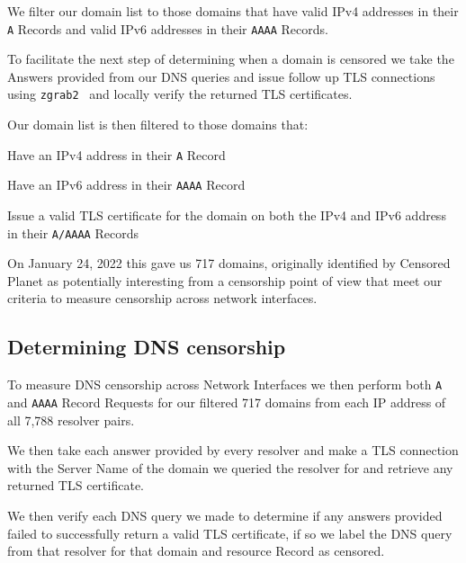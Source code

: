 We filter our domain list to those domains that have valid IPv4 addresses in
their \texttt{A} Records and valid IPv6 addresses in their \texttt{AAAA}
Records.

To facilitate the next step of determining when a domain is censored we take the
Answers provided from our DNS queries and issue follow up TLS connections using
\texttt{zgrab2}~\cite{Durumeric13zmap} and locally verify the returned TLS
certificates.

Our domain list is then filtered to those domains that:
\begin{packed_enumerate}
    \item Have an IPv4 address in their \texttt{A} Record
    \item Have an IPv6 address in their \texttt{AAAA} Record
    \item Issue a valid TLS certificate for the domain on both the IPv4 and IPv6
    address in their \texttt{A/AAAA} Records
\end{packed_enumerate}

On January 24, 2022 this gave us 717 domains, originally identified by Censored
Planet as potentially interesting from a censorship point of view that meet our
criteria to measure censorship across network interfaces.

\subsection{Determining DNS censorship}\label{ssec:determining-censorship}

To measure DNS censorship across Network Interfaces we then perform both
\texttt{A} and \texttt{AAAA} Record Requests for our filtered 717 domains from
each IP address of all 7,788 resolver pairs.

We then take each answer provided by every resolver and make a TLS connection
with the Server Name of the domain we queried the resolver for and retrieve any
returned TLS certificate.

We then verify each DNS query we made to determine if any answers provided
failed to successfully return a valid TLS certificate, if so we label the DNS
query from that resolver for that domain and resource Record as censored.
